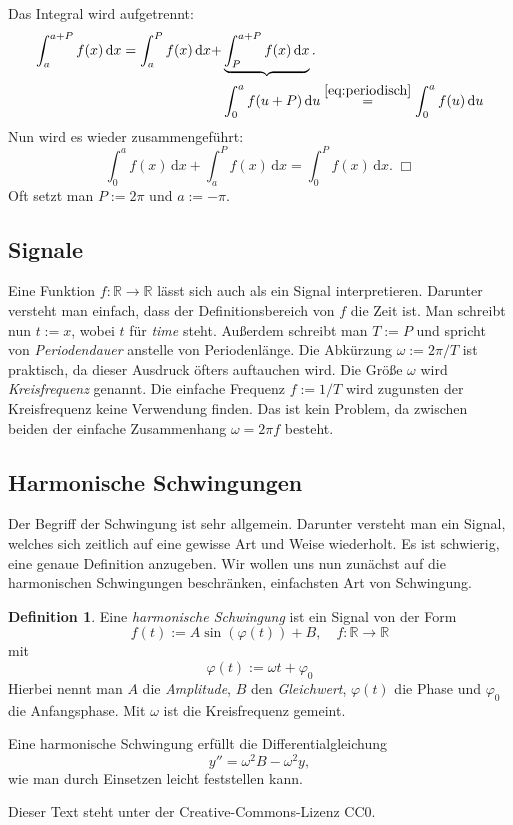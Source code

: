 \documentclass[a4paper,12pt,fleqn,twoside]{article}
\newcommand{\R}{\mathbb R}
\newcommand{\emdef}[1]{\emph{#1}}
\theoremstyle{definition}
\newtheorem{Definition}{Definition}
\theoremstyle{theorem}
\begin{document}
Das Integral wird aufgetrennt:
\begin{equation}
\begin{split}
\int_{a}^{a+P}f(x)\,\mathrm dx
=\int_{a}^{P}f(x)\,\mathrm dx+&\underbrace{\int_{P}^{a+P}f(x)\,\mathrm dx}.\\
&\int_0^a f(u+P)\,\mathrm du
\stackrel{\eqref{eq:periodisch}}{=} \int_0^a f(u)\,\mathrm du
\end{split}
\end{equation}
Nun wird es wieder zusammengeführt:
\begin{equation}
\int_0^a f(x)\,\mathrm dx+\int_a^P f(x)\,\mathrm dx
= \int_0^P f(x)\,\mathrm dx.\;\Box
\end{equation}
Oft setzt man $P:=2\pi$ und $a:=-\pi$.

\subsection{Signale}
Eine Funktion $f\colon\R\to\R$ lässt sich auch als ein Signal
interpretieren. Darunter versteht man einfach, dass der
Definitionsbereich von $f$ die Zeit ist. Man schreibt nun $t:=x$,
wobei $t$ für \emph{time} steht. Außerdem schreibt man $T:=P$ und
spricht von \emdef{Periodendauer} anstelle von Periodenlänge.
Die Abkürzung $\omega:=2\pi/T$ ist praktisch, da dieser Ausdruck öfters
auftauchen wird. Die Größe $\omega$ wird \emdef{Kreisfrequenz}
genannt. Die einfache Frequenz $f:=1/T$ wird zugunsten der
Kreisfrequenz keine Verwendung finden. Das ist kein Problem, da
zwischen beiden der einfache Zusammenhang $\omega = 2\pi f$
besteht.

\subsection{Harmonische Schwingungen}
Der Begriff der Schwingung ist sehr allgemein. Darunter versteht
man ein Signal, welches sich zeitlich auf eine gewisse Art und
Weise wiederholt. Es ist schwierig, eine genaue Definition
anzugeben. Wir wollen uns nun zunächst auf die harmonischen
Schwingungen beschränken, einfachsten Art von Schwingung.

\begin{Definition}
Eine \emdef{harmonische Schwingung} ist ein Signal von der Form
\begin{equation}
f(t) := A\sin(\varphi(t))+B,\quad f\colon\R\to\R
\end{equation}
mit
\begin{equation}
\varphi(t) := \omega t+\varphi_0
\end{equation}
Hierbei nennt man $A$ die \emdef{Amplitude}, $B$ den \emdef{Gleichwert},
$\varphi(t)$ die Phase und $\varphi_0$ die Anfangsphase.
Mit $\omega$ ist die Kreisfrequenz gemeint.
\end{Definition}
\noindent
Eine harmonische Schwingung erfüllt die Differentialgleichung
\begin{equation}
y'' = \omega^2 B-\omega^2 y,
\end{equation}
wie man durch Einsetzen leicht feststellen kann.


\vfill\noindent
Dieser Text steht unter der Creative-Commons-Lizenz CC0.
\end{document}
